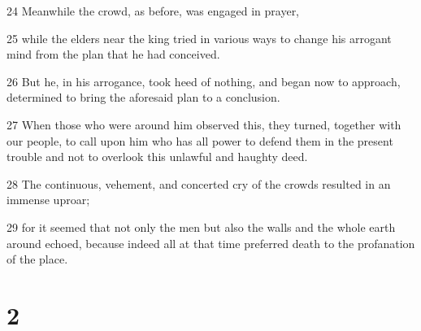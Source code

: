 \par 24 Meanwhile the crowd, as before, was engaged in prayer,
\par 25 while the elders near the king tried in various ways to change his arrogant mind from the plan that he had conceived.
\par 26 But he, in his arrogance, took heed of nothing, and began now to approach, determined to bring the aforesaid plan to a conclusion.
\par 27 When those who were around him observed this, they turned, together with our people, to call upon him who has all power to defend them in the present trouble and not to overlook this unlawful and haughty deed.
\par 28 The continuous, vehement, and concerted cry of the crowds resulted in an immense uproar;
\par 29 for it seemed that not only the men but also the walls and the whole earth around echoed, because indeed all at that time preferred death to the profanation of the place.

\chapter{2}

